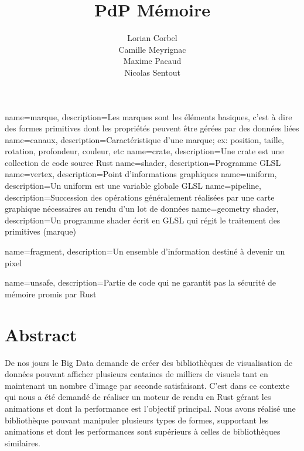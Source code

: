 \documentclass[12pt]{article}
\title{\gls{PdP} \smallbreak Mémoire }
\author{Lorian Corbel \\ Camille Meyrignac \\ Maxime Pacaud \\ Nicolas Sentout}
\begin{document}

{ 
    name=marque,  
    description={Les marques sont les éléments basiques, c'est à dire des formes primitives dont les
    propriétés peuvent être gérées par des données liées} 
}
{ 
    name=canaux,  
    description={Caractéristique d'une marque; ex: position, taille, rotation, profondeur, couleur, etc} 
}
{
    name=crate,  
    description={Une crate est une collection de code source Rust} 
}
{
    name=shader,
    description={Programme GLSL}
}
{
    name=vertex,
    description={Point d'informations graphiques}
}
{
    name=uniform,
    description={Un uniform est une variable globale GLSL}
}
{
    name=pipeline,
    description={Succession des opérations généralement réalisées par une carte graphique nécessaires au
    rendu d'un lot de données}
}
{
    name={geometry shader},
    description={Un programme shader écrit en GLSL qui régit le traitement des primitives (marque)}
}

{
    name={fragment},
    description={Un ensemble d'information destiné à devenir un pixel}
}


{
    name={unsafe},
    description={Partie de code qui ne garantit pas la sécurité de mémoire promis par Rust}
}

\maketitle
\tableofcontents
\newpage

\section{Abstract}

De nos jours le Big Data demande de créer des bibliothèques de visualisation de données pouvant afficher plusieurs centaines de milliers de visuels tant en maintenant un nombre d'image par seconde satisfaisant. 
C'est dans ce contexte qui nous a été demandé de réaliser un moteur de rendu en Rust gérant les animations et dont la performance est l'objectif principal. Nous avons réalisé une bibliothèque pouvant manipuler plusieurs types de formes, supportant les animations et dont les performances sont supérieurs à celles de bibliothèques similaires.  
 
\end{document}
